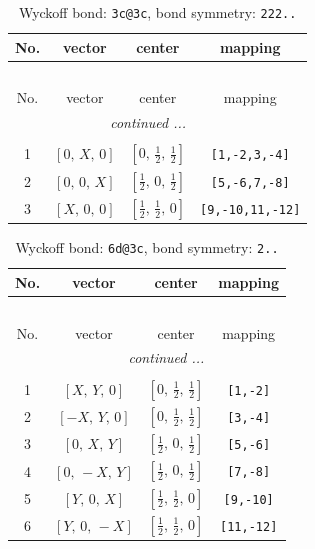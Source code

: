 \documentclass[fleqn,8pt]{jsarticle}
\begin{document}
\renewcommand{\arraystretch}{1.2}
\begin{longtable}{cccc}
\caption{Wyckoff bond: {\tt 3c@3c}, bond symmetry: {\tt 222..}}
 \\
 \hline \hline
No. & vector & center & mapping \\ \hline \endfirsthead

\multicolumn{3}{l}{\tablename\ \thetable{}} \\
 \hline \hline
No. & vector & center & mapping \\ \hline \endhead

 \hline \hline
\multicolumn{3}{r}{\footnotesize\it continued ...} \\ \endfoot

 \hline \hline
\multicolumn{3}{r}{} \\ \endlastfoot

1 & $\left[ 0,\, X,\, 0 \right]$ & $\left[ 0,\, \frac{1}{2},\, \frac{1}{2} \right]$ & {\tt [1,-2,3,-4]} \\ \hline
2 & $\left[ 0,\, 0,\, X \right]$ & $\left[ \frac{1}{2},\, 0,\, \frac{1}{2} \right]$ & {\tt [5,-6,7,-8]} \\ \hline
3 & $\left[ X,\, 0,\, 0 \right]$ & $\left[ \frac{1}{2},\, \frac{1}{2},\, 0 \right]$ & {\tt [9,-10,11,-12]} \\
\end{longtable}
\renewcommand{\arraystretch}{1.2}
\begin{longtable}{cccc}
\caption{Wyckoff bond: {\tt 6d@3c}, bond symmetry: {\tt 2..}}
 \\
 \hline \hline
No. & vector & center & mapping \\ \hline \endfirsthead

\multicolumn{3}{l}{\tablename\ \thetable{}} \\
 \hline \hline
No. & vector & center & mapping \\ \hline \endhead

 \hline \hline
\multicolumn{3}{r}{\footnotesize\it continued ...} \\ \endfoot

 \hline \hline
\multicolumn{3}{r}{} \\ \endlastfoot

1 & $\left[ X,\, Y,\, 0 \right]$ & $\left[ 0,\, \frac{1}{2},\, \frac{1}{2} \right]$ & {\tt [1,-2]} \\ \hline
2 & $\left[ - X,\, Y,\, 0 \right]$ & $\left[ 0,\, \frac{1}{2},\, \frac{1}{2} \right]$ & {\tt [3,-4]} \\ \hline
3 & $\left[ 0,\, X,\, Y \right]$ & $\left[ \frac{1}{2},\, 0,\, \frac{1}{2} \right]$ & {\tt [5,-6]} \\ \hline
4 & $\left[ 0,\, - X,\, Y \right]$ & $\left[ \frac{1}{2},\, 0,\, \frac{1}{2} \right]$ & {\tt [7,-8]} \\ \hline
5 & $\left[ Y,\, 0,\, X \right]$ & $\left[ \frac{1}{2},\, \frac{1}{2},\, 0 \right]$ & {\tt [9,-10]} \\ \hline
6 & $\left[ Y,\, 0,\, - X \right]$ & $\left[ \frac{1}{2},\, \frac{1}{2},\, 0 \right]$ & {\tt [11,-12]} \\
\end{longtable}
\end{document}
